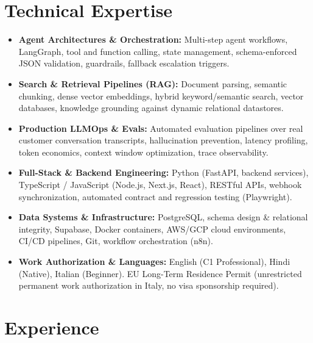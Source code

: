 \documentclass[10pt,a4paper]{article}
\begin{document}
\section{Technical Expertise}
\begin{itemize}
  \item \textbf{Agent Architectures \& Orchestration:} Multi-step agent workflows, LangGraph, tool and function calling, state management, schema-enforced JSON validation, guardrails, fallback escalation triggers.
  \item \textbf{Search \& Retrieval Pipelines (RAG):} Document parsing, semantic chunking, dense vector embeddings, hybrid keyword/semantic search, vector databases, knowledge grounding against dynamic relational datastores.
  \item \textbf{Production LLMOps \& Evals:} Automated evaluation pipelines over real customer conversation transcripts, hallucination prevention, latency profiling, token economics, context window optimization, trace observability.
  \item \textbf{Full-Stack \& Backend Engineering:} Python (FastAPI, backend services), TypeScript / JavaScript (Node.js, Next.js, React), RESTful APIs, webhook synchronization, automated contract and regression testing (Playwright).
  \item \textbf{Data Systems \& Infrastructure:} PostgreSQL, schema design \& relational integrity, Supabase, Docker containers, AWS/GCP cloud environments, CI/CD pipelines, Git, workflow orchestration (n8n).
  \item \textbf{Work Authorization \& Languages:} English (C1 Professional), Hindi (Native), Italian (Beginner). EU Long-Term Residence Permit (unrestricted permanent work authorization in Italy, no visa sponsorship required).
\end{itemize}

\section{Experience}
\end{document}
